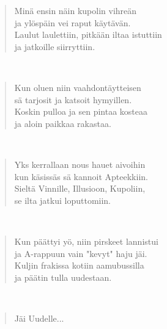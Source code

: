 \noindent\begin{minipage}{\linewidth}
\begin{verse}
	Minä ensin näin kupolin vihreän\\
	ja ylöspäin vei raput käytävän.\\
	Laulut laulettiin, pitkään iltaa istuttiin\\
	ja jatkoille siirryttiin.\\
\end{verse}
\end{minipage}\\[10pt]
\noindent\begin{minipage}{\linewidth}
\begin{verse}
	Kun oluen niin vaahdontäytteisen\\
	sä tarjosit ja katsoit hymyillen.\\
	Koskin pulloa ja sen pintaa kosteaa\\
	ja aloin paikkaa rakastaa.\\
\end{verse}
\end{minipage}\\[10pt]
\noindent\begin{minipage}{\linewidth}
\begin{verse}
	Yks kerrallaan nous hauet aivoihin\\
	kun käsissäs sä kannoit Apteekkiin.\\
	Sieltä Vinnille, Illusioon, Kupoliin,\\
	se ilta jatkui loputtomiin.\\
\end{verse}
\end{minipage}\\[10pt]
\noindent\begin{minipage}{\linewidth}
\begin{verse}
	Kun päättyi yö, niin pirskeet lannistui\\
	ja A-rappuun vain "kevyt" haju jäi.\\
	Kuljin frakissa kotiin aamubussilla\\
	ja päätin tulla uudestaan.\\
\end{verse}
\end{minipage}\\[10pt]
\noindent\begin{minipage}{\linewidth}
\begin{verse}
	Jäi Uudelle...\\
\end{verse}
\end{minipage}\\[10pt]
